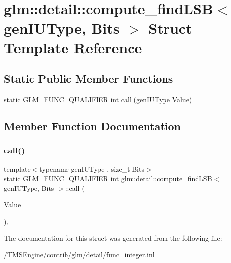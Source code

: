\hypertarget{structglm_1_1detail_1_1compute__find_l_s_b}{}\section{glm\+:\+:detail\+:\+:compute\+\_\+find\+L\+SB$<$ gen\+I\+U\+Type, Bits $>$ Struct Template Reference}
\label{structglm_1_1detail_1_1compute__find_l_s_b}
\subsection*{Static Public Member Functions}
\begin{DoxyCompactItemize}
\item 
static \hyperlink{setup_8hpp_a33fdea6f91c5f834105f7415e2a64407}{G\+L\+M\+\_\+\+F\+U\+N\+C\+\_\+\+Q\+U\+A\+L\+I\+F\+I\+ER} int \hyperlink{structglm_1_1detail_1_1compute__find_l_s_b_a1c0ec72e2bcf35a3109e85cfc536400b}{call} (gen\+I\+U\+Type Value)
\end{DoxyCompactItemize}


\subsection{Member Function Documentation}
\mbox{\label{structglm_1_1detail_1_1compute__find_l_s_b_a1c0ec72e2bcf35a3109e85cfc536400b}} 
\subsubsection{\texorpdfstring{call()}{call()}}
{\footnotesize\ttfamily template$<$typename gen\+I\+U\+Type , size\+\_\+t Bits$>$ \\
static \hyperlink{setup_8hpp_a33fdea6f91c5f834105f7415e2a64407}{G\+L\+M\+\_\+\+F\+U\+N\+C\+\_\+\+Q\+U\+A\+L\+I\+F\+I\+ER} int \hyperlink{structglm_1_1detail_1_1compute__find_l_s_b}{glm\+::detail\+::compute\+\_\+find\+L\+SB}$<$ gen\+I\+U\+Type, Bits $>$\+::call (\begin{DoxyParamCaption}\item[{gen\+I\+U\+Type}]{Value }\end{DoxyParamCaption})\hspace{0.3cm}{\ttfamily [inline]}, {\ttfamily [static]}}



The documentation for this struct was generated from the following file\+:\begin{DoxyCompactItemize}
\item 
/\+T\+M\+S\+Engine/contrib/glm/detail/\hyperlink{func__integer_8inl}{func\+\_\+integer.\+inl}\end{DoxyCompactItemize}
